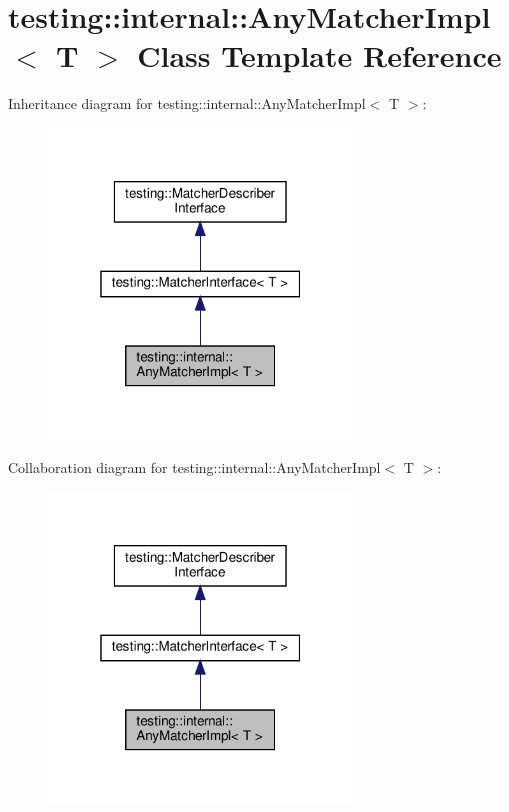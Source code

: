 \hypertarget{classtesting_1_1internal_1_1_any_matcher_impl}{}\section{testing\+:\+:internal\+:\+:Any\+Matcher\+Impl$<$ T $>$ Class Template Reference}
\label{classtesting_1_1internal_1_1_any_matcher_impl}


Inheritance diagram for testing\+:\+:internal\+:\+:Any\+Matcher\+Impl$<$ T $>$\+:
\nopagebreak
\begin{figure}[H]
\begin{center}
\leavevmode
\includegraphics[width=229pt]{classtesting_1_1internal_1_1_any_matcher_impl__inherit__graph}
\end{center}
\end{figure}


Collaboration diagram for testing\+:\+:internal\+:\+:Any\+Matcher\+Impl$<$ T $>$\+:
\nopagebreak
\begin{figure}[H]
\begin{center}
\leavevmode
\includegraphics[width=229pt]{classtesting_1_1internal_1_1_any_matcher_impl__coll__graph}
\end{center}
\end{figure}
